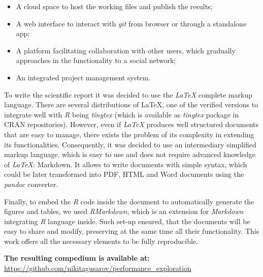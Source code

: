 \documentclass[12pt,]{article}
\providecommand{\tightlist}{%
  \setlength{\itemsep}{0pt}\setlength{\parskip}{0pt}}
\begin{document}
\begin{itemize}
\tightlist
\item
  A cloud space to host the working files and publish the results;
\item
  A web interface to interact with \emph{git} from browser or through a
  standalone app;
\item
  A platform facilitating collaboration with other users, which
  gradually approaches in the functionality to a social network;
\item
  An integrated project management system.
\end{itemize}

To write the scientific report it was decided to use the \emph{LaTeX}
complete markup language. There are several distributions of LaTeX, one
of the verified versions to integrate well with \emph{R} being
\emph{tinytex} (which is available as \emph{tinytex} package in CRAN
repositories). However, even if \emph{LaTeX} produces well structured
documents that are easy to manage, there exists the problem of its
complexity in extending its functionalities. Consequently, it was
decided to use an intermediary simplified markup language, which is easy
to use and does not require advanced knowledge of \emph{LaTeX}:
Markdown. It allows to write documents with simple syntax, which could
be later transformed into PDF, HTML and Word documents using the
\emph{pandoc} converter.

Finally, to embed the \emph{R} code inside the document to automatically
generate the figures and tables, we used \emph{RMarkdown}, which is an
extension for \emph{Markdown} integrating \emph{R} language inside. Such
set-up ensured, that the documents will be easy to share and modify,
preserving at the same time all their functionality. This work offers
all the necessary elements to be fully reproducible.

\textbf{The resulting compedium is available at:}
\url{https://github.com/nikitagusarov/performance_exploration}

\newpage
\end{document}
